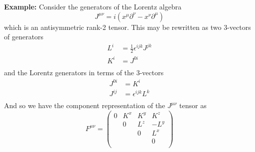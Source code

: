 \documentclass[12pt]{article}
\theoremstyle{definition}
\begin{document}
\textbf{Example:} Consider the generators of the Lorentz algebra
\begin{equation*}
    J^{\mu\nu} = i (x^\mu \partial^\nu - x^\nu \partial^\mu) 
\end{equation*}
which is an antisymmetric rank-2 tensor. This may be rewritten as two 3-vectors of generators
\begin{equation*}
\begin{split}
    L^i &= \frac{1}{2} \epsilon^{ijk} J^{jk} \\
    K^i &= J^{0i} \\
\end{split}
\end{equation*}
and the Lorentz generators in terms of the 3-vectors
\begin{equation*}
\begin{split}
    J^{0i} &= K^i \\
    J^{ij} &= \epsilon^{ijk} L^k \\
\end{split}
\end{equation*}
And so we have the component representation of the $J^{\mu\nu}$ tensor as
\begin{equation*}
    F^{\mu\nu}
    =
    \begin{pmatrix}
        0 & K^x & K^y & K^z \\
        & 0 & L^z & -L^y \\
        & & 0 & L^x \\
        & & & 0 \\
    \end{pmatrix}
\end{equation*}
\end{document}
